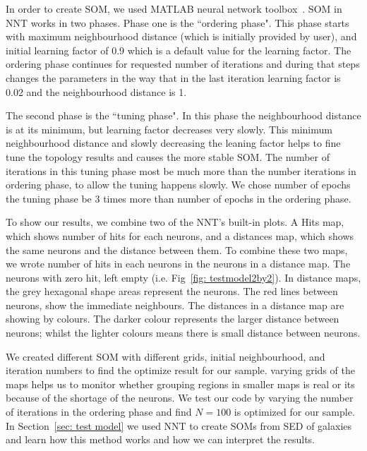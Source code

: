     In order to create SOM, we used {\tiny MATLAB} neural network toolbox~\citep[NNT,][]{matlabtolbox}.
     SOM in {\tiny NNT} works in two phases. 
     Phase one is the ``ordering phase". 
     This phase starts with maximum neighbourhood distance (which is initially provided by user), and initial learning factor of 0.9 which is a default value for the learning factor. 
     The ordering phase continues for requested number of iterations and during that steps changes the parameters in the way that in the last iteration learning factor is 0.02 and the neighbourhood distance is 1.
     
     The second phase is the ``tuning phase".
     In this phase the neighbourhood distance is at its minimum, but learning factor decreases very slowly.
     This minimum neighbourhood distance and slowly decreasing the leaning factor helps to fine tune the topology results and causes the more stable SOM. 
     The number of iterations in this tuning phase most be much more than the number iterations in ordering phase, to allow the tuning happens slowly. 
     We chose number of epochs the tuning phase be 3 times more than number of epochs in the ordering phase.
     
     To show our results, we combine two of the {\tiny NNT}'s built-in plots. 
     A Hits map, which shows number of hits for each neurons, and a distances map, which shows the same neurons and the distance between them. 
     To combine these two maps, we wrote number of hits in each neurons in the neurons in a distance map.
     The neurons with zero hit, left empty  (i.e. Fig~\ref{fig: testmodel2by2}).
     In distance maps, the grey hexagonal shape areas represent the neurons.
     The red lines between neurons, show the immediate neighbours.
     The distances in a distance map are showing by colours.
     The darker colour represents the larger distance between neurons; whilst the lighter colours means there is small distance between neurons.
    
     We created different SOM with different grids, initial neighbourhood, and iteration numbers to find the optimize result for our sample.
     varying grids of the maps helps us to monitor whether grouping regions in smaller maps is real or its because of the shortage of the neurons.
     We test our code by varying the number of iterations in the ordering phase and find $N = 100$  is optimized for our sample.
     In Section~\ref{sec: test model} we used NNT to create SOMs from SED of galaxies and learn how this method works and how we can interpret the results.
   
